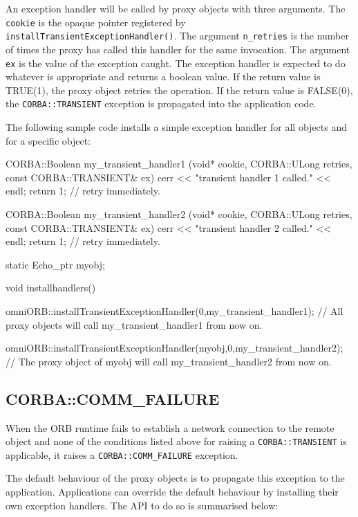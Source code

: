 \documentclass[11pt,twoside,a4paper]{book}
\newcommand{\code}[1]{\texttt{#1}}
\newcommand{\op}[1]{\texttt{#1()}}
\begin{document}
An exception handler will be called by proxy objects with three
arguments. The \code{cookie} is the opaque pointer registered by
\op{installTransientExceptionHandler}. The argument \code{n\_retries}
is the number of times the proxy has called this handler for the same
invocation. The argument \code{ex} is the value of the exception
caught.  The exception handler is expected to do whatever is
appropriate and returns a boolean value. If the return value is
TRUE(1), the proxy object retries the operation. If the return value
is FALSE(0), the \code{CORBA::TRANSIENT} exception is propagated into
the application code.

The following sample code installs a simple exception handler for all
objects and for a specific object:

\begin{cxxlisting}
CORBA::Boolean my_transient_handler1 (void* cookie,
                                      CORBA::ULong retries,
                                      const CORBA::TRANSIENT& ex)
{
   cerr << "transient handler 1 called." << endl;
   return 1;           // retry immediately.
}
 
CORBA::Boolean my_transient_handler2 (void* cookie,
                                      CORBA::ULong retries,
                                      const CORBA::TRANSIENT& ex)
{
   cerr << "transient handler 2 called." << endl;
   return 1;           // retry immediately.
}


static Echo_ptr myobj;

void installhandlers()
{
   omniORB::installTransientExceptionHandler(0,my_transient_handler1);
   // All proxy objects will call my_transient_handler1 from now on.

   omniORB::installTransientExceptionHandler(myobj,0,my_transient_handler2);
   // The proxy object of myobj will call my_transient_handler2 from now on.
}
\end{cxxlisting}


\subsection{CORBA::COMM\_FAILURE}

When the ORB runtime fails to establish a network connection to the
remote object and none of the conditions listed above for raising a
\code{CORBA::TRANSIENT} is applicable, it raises a
\code{CORBA::COMM\_FAILURE} exception.

The default behaviour of the proxy objects is to propagate this
exception to the application. Applications can override the default
behaviour by installing their own exception handlers. The API to do so
is summarised below:
\end{document}
